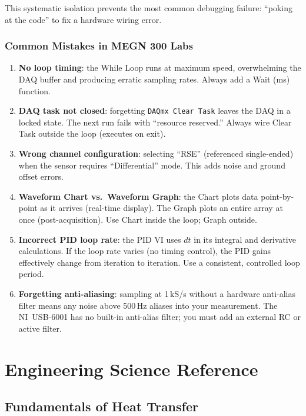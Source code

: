 \documentclass[11pt,letterpaper,twoside,openany]{book}
\begin{document}
This systematic isolation prevents the most common debugging failure: ``poking at the code'' to fix a hardware wiring error.

\section*{Common Mistakes in MEGN 300 Labs}
\begin{enumerate}[leftmargin=1.5em]
\item \textbf{No loop timing}: the While Loop runs at maximum speed, overwhelming the DAQ buffer and producing erratic sampling rates. Always add a Wait (ms) function.
\item \textbf{DAQ task not closed}: forgetting \texttt{DAQmx Clear Task} leaves the DAQ in a locked state. The next run fails with ``resource reserved.'' Always wire Clear Task outside the loop (executes on exit).
\item \textbf{Wrong channel configuration}: selecting ``RSE'' (referenced single-ended) when the sensor requires ``Differential'' mode. This adds noise and ground offset errors.
\item \textbf{Waveform Chart vs.\ Waveform Graph}: the Chart plots data point-by-point as it arrives (real-time display). The Graph plots an entire array at once (post-acquisition). Use Chart inside the loop; Graph outside.
\item \textbf{Incorrect PID loop rate}: the PID VI uses $dt$ in its integral and derivative calculations. If the loop rate varies (no timing control), the PID gains effectively change from iteration to iteration. Use a consistent, controlled loop period.
\item \textbf{Forgetting anti-aliasing}: sampling at 1\,kS/s without a hardware anti-alias filter means any noise above 500\,Hz aliases into your measurement. The NI~USB-6001 has no built-in anti-alias filter; you must add an external RC or active filter.
\end{enumerate}

\part{Engineering Science Reference}

\chapter{Fundamentals of Heat Transfer}
\label{ch:heat}
\end{document}
